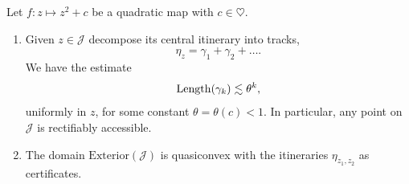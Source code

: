 \begin{theorem}  Let $f:z \mapsto z^2+c$ be a quadratic map with $c \in \heartsuit$. \leavevmode
\begin{enumerate}[label=\normalfont(\roman*)]

\item Given $z\in\mathcal{J}$ decompose its central itinerary into tracks, 
\begin{equation*}
\eta_z = \gamma _1 +\gamma_2 +\dots.
\end{equation*}
We have the estimate
\begin{equation*}
\operatorname{Length}(\gamma_{k})\lesssim\theta^{k},
\end{equation*}
uniformly in $z$, for some constant $\theta=\theta(c)<1$. 
In particular, any point on \(\mathcal{J}\) is rectifiably accessible.

\item The domain $\mathrm{Exterior}(\mathcal{J})$ is quasiconvex with the itineraries $\eta_{z_1,z_2}$ as certificates.
	\end{enumerate}
\end{theorem}

